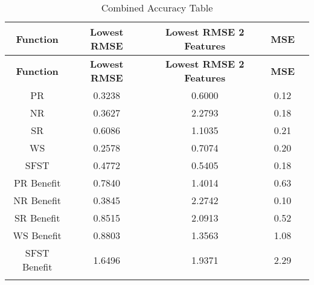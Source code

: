 \begin{longtable}{|c|c|c|c|c|}
\hline
\textbf{Function} & \textbf{Lowest RMSE} & \textbf{Lowest RMSE 2 Features} & \textbf{MSE} \\ \hline
\endfirsthead
\hline
\textbf{Function} & \textbf{Lowest RMSE} & \textbf{Lowest RMSE 2 Features} & \textbf{MSE} \\ \hline
\endhead

PR & 0.3238 & 0.6000 & 0.12 \\ \hline
NR & 0.3627 & 2.2793 & 0.18 \\ \hline
SR & 0.6086 & 1.1035 & 0.21 \\ \hline
WS & 0.2578 & 0.7074 & 0.20 \\ \hline
SFST & 0.4772 & 0.5405 & 0.18 \\ \hline
PR Benefit & 0.7840 & 1.4014 & 0.63 \\ \hline
NR Benefit & 0.3845 & 2.2742 & 0.10 \\ \hline
SR Benefit & 0.8515 & 2.0913 & 0.52 \\ \hline
WS Benefit & 0.8803 & 1.3563 & 1.08 \\ \hline
SFST Benefit & 1.6496 & 1.9371 & 2.29 \\ \hline

\caption{Combined Accuracy Table}
\label{fig_reg_specxtra:all_rmse_feat}
\end{longtable}

